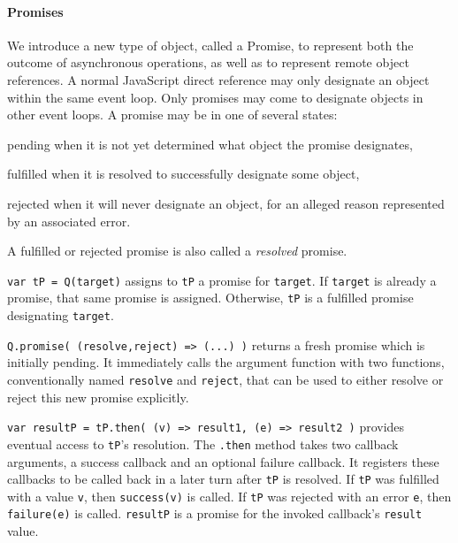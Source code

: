 \documentclass{llncs}
\begin{document}
\paragraph{Promises}

We introduce a new type of object, called a Promise, to represent both the outcome of asynchronous operations, as well as to represent remote object references. A normal JavaScript direct reference may only designate an object within the same event loop. Only promises may come to designate objects in other event loops. A promise may be in one of several states:

\begin{description*}
  \item[pending] when it is not yet determined what object the promise designates,
  \item[fulfilled] when it is resolved to successfully designate some object,
  \item[rejected] when it will never designate an object, for an alleged reason represented by an associated error.
\end{description*}

A fulfilled or rejected promise is also called a \emph{resolved} promise.

\begin{description*}
\item[{\tt var tP = Q(target)}] assigns to {\tt tP} a promise for {\tt target}. If {\tt target} is already a promise, that same promise is assigned. Otherwise, {\tt tP} is a fulfilled promise designating {\tt target}.

\item[{\tt Q.promise( (resolve,reject) => (...) )}] returns a fresh promise which is initially pending. It immediately calls the argument function with two functions, conventionally named {\tt resolve} and {\tt reject}, that can be used to either resolve or reject this new promise explicitly. 

\item[{\tt var resultP = tP.then( (v) => result1, (e) => result2 )}] provides eventual access to {\tt tP}'s resolution. The {\tt .then} method takes two callback arguments, a success callback and an optional failure callback. It registers these callbacks to be called back in a later turn after {\tt tP} is resolved. If {\tt tP} was fulfilled with a value {\tt v}, then {\tt success(v)} is called. If {\tt tP} was rejected with an error {\tt e}, then {\tt failure(e)} is called. {\tt resultP} is a promise for the invoked callback's {\tt result} value. 
\end{description*}
\end{document}
